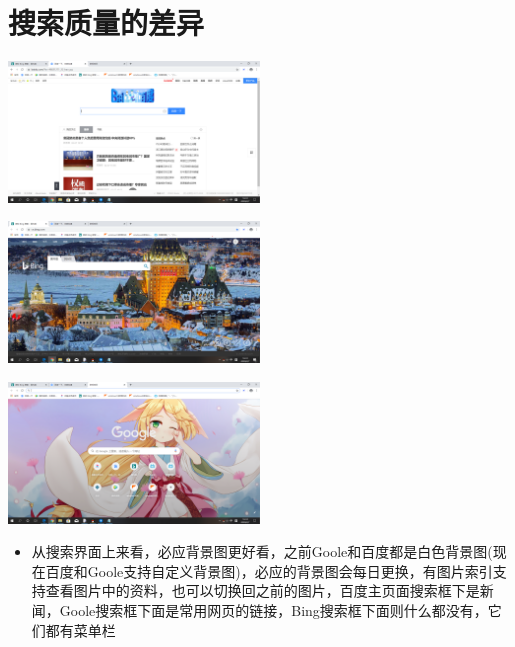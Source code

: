 \documentclass[a4paper,12pt]{report}
\begin{document}
\section{搜索质量的差异}

\begin{center}%
    \includegraphics[width=0.5\textwidth]{baidu.png} %
\end{center}

\begin{center}%
    \includegraphics[width=0.5\textwidth]{bing.png} %
\end{center}

\begin{center}%
    \includegraphics[width=0.5\textwidth]{Goole.png} %
\end{center}

\begin{itemize}
    \item 
从搜索界面上来看，必应背景图更好看，之前Goole和百度都是白色背景图(现在百度和Goole支持自定义背景图)，必应的背景图会每日更换，有图片索引支持查看图片中的资料，也可以切换回之前的图片，百度主页面搜索框下是新闻，Goole搜索框下面是常用网页的链接，Bing搜索框下面则什么都没有，它们都有菜单栏
\end{itemize}
\end{document}
